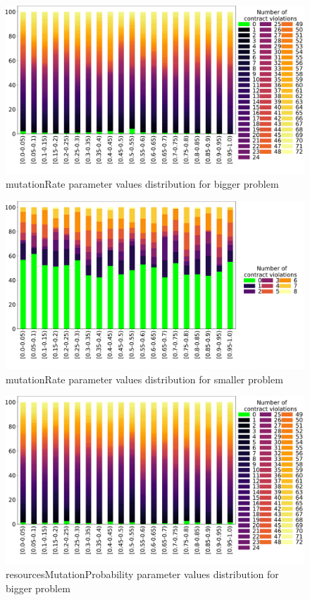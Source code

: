 \begin{figure}
	\centering
	\includegraphics[width=\textwidth]{images/DistrValidityBig/mutationRate.pdf}
	\caption[mutationRate parameter values distribution for bigger problem]{mutationRate parameter values distribution for bigger problem}
	\label{fig:mutationRate_DistBig}
\end{figure}
\begin{figure}
	\centering
	\includegraphics[width=\textwidth]{images/DistrValiditySmall/mutationRate.pdf}
	\caption[mutationRate parameter values distribution for smaller problem]{mutationRate parameter values distribution for smaller problem}
	\label{fig:mutationRate_DistSmall}
\end{figure}
\begin{figure}
	\centering
	\includegraphics[width=\textwidth]{images/DistrValidityBig/resourcesMutationProbability.pdf}
	\caption[resourcesMutationProbability parameter values distribution for bigger problem]{resourcesMutationProbability parameter values distribution for bigger problem}
	\label{fig:resourcesMutationProbability_DistBig}
\end{figure}
